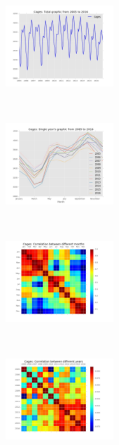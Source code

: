 \begin{figure}[h]
    \centering
    \begin{subfigure}[t]{0.20\textwidth}
        \centering
        \includegraphics[height=1.2in]{Files/Cages_Total.jpg}

    \end{subfigure}%
    ~ 
    \begin{subfigure}[t]{0.20\textwidth}
        \centering
        \includegraphics[height=1.2in]{Files/Cages_Years.jpg}

    \end{subfigure}
    ~ 
    \begin{subfigure}[t]{0.20\textwidth}
        \centering
        \includegraphics[height=1.2in]{Files/Cages_Months_Matrix.jpg}

    \end{subfigure}%
    ~ 
    \begin{subfigure}[t]{0.20\textwidth}
        \centering
        \includegraphics[height=1.2in]{Files/Cages_Years_Matrix.jpg}

    \end{subfigure}

\end{figure}
\fi
